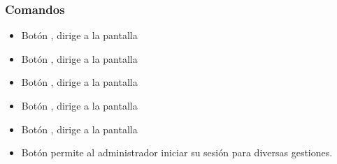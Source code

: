 \subsubsection{Comandos}
\begin{itemize}
	
	\item Botón \botSalones, dirige a la pantalla 
	\item Botón \botProfesores, dirige a la pantalla 
	\item Botón \botUnidades, dirige a la pantalla 
	\item Botón \botMovilidad, dirige a la pantalla 
	\item Botón \botCursos, dirige a la pantalla 
	\item Botón  permite al administrador iniciar su sesión para diversas gestiones.
\end{itemize}

